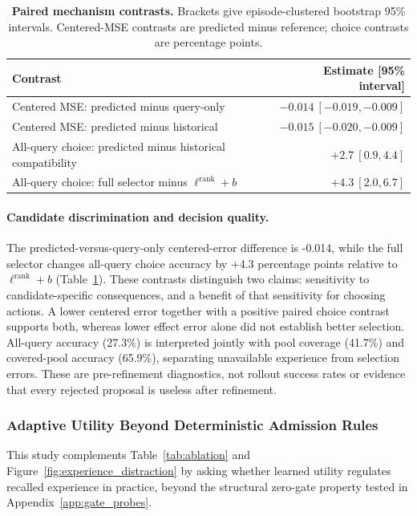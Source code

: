 \begin{table}[H]
\centering\small
\caption{\textbf{Paired mechanism contrasts.}
Brackets give episode-clustered bootstrap 95\% intervals.
Centered-MSE contrasts are predicted minus reference; choice contrasts are percentage points.}
\label{tab:rebuttal_effect_deltas}
\begin{tabularx}{\linewidth}{@{}Xr@{}}
\toprule
Contrast & Estimate [95\% interval] \\
\midrule
Centered MSE: predicted minus query-only & $-0.014\ [-0.019,-0.009]$ \\
Centered MSE: predicted minus historical & $-0.015\ [-0.020,-0.009]$ \\
All-query choice: predicted minus historical compatibility & $+2.7\ [0.9,4.4]$ \\
All-query choice: full selector minus $\ell^{\mathrm{rank}}+b$ & $+4.3\ [2.0,6.7]$ \\
\bottomrule
\end{tabularx}
\end{table}

\paragraph{Candidate discrimination and decision quality.}
The predicted-versus-query-only centered-error difference is -0.014, while the full selector changes all-query choice accuracy by +4.3 percentage points relative to $\ell^{\mathrm{rank}}+b$ (Table~\ref{tab:rebuttal_effect_deltas}).
These contrasts distinguish two claims: sensitivity to candidate-specific consequences, and a benefit of that sensitivity for choosing actions.
A lower centered error together with a positive paired choice contrast supports both, whereas lower effect error alone did not establish better selection.
All-query accuracy (27.3\%) is interpreted jointly with pool coverage (41.7\%) and covered-pool accuracy (65.9\%), separating unavailable experience from selection errors.
These are pre-refinement diagnostics, not rollout success rates or evidence that every rejected proposal is useless after refinement.

\subsubsection{Adaptive Utility Beyond Deterministic Admission Rules}
\label{app:rebuttal_gate}

This study complements Table~\ref{tab:ablation} and Figure~\ref{fig:experience_distraction} by asking whether learned utility regulates recalled experience in practice, beyond the structural zero-gate property tested in Appendix~\ref{app:gate_probes}.


